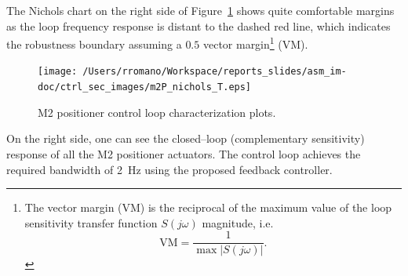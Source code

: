 \documentclass{gmto}
\begin{document}
The Nichols chart on the right side of Figure~\ref{fig:m2P_nichols_T} shows quite comfortable margins as the loop frequency response is distant to the dashed red line, which indicates the robustness boundary assuming a $0.5$ vector margin\footnote{The vector margin (VM) is the reciprocal of the maximum value of the loop sensitivity transfer function $S\left(j\omega\right)$ magnitude, i.e.$$\text{VM}=\frac{1}{\max \left|S(j\omega)\right|}.$$} (VM). %
%
\begin{figure}[!hbt]
    \vspace{6pt}
    \centering
    \texttt{[image: /Users/rromano/Workspace/reports\_slides/asm\_im-doc/ctrl\_sec\_images/m2P\_nichols\_T.eps]}
    \caption{M2 positioner control loop characterization plots.}
    \label{fig:m2P_nichols_T}
\end{figure}
%
On the right side, one can see the closed--loop (complementary sensitivity) response of all the M2 positioner actuators. The control loop achieves the required bandwidth of \SI{2}{Hz} using the proposed feedback controller. %

\end{document}
